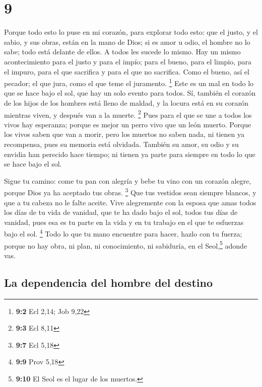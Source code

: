 \hypertarget{section-8}{%
\section{9}\label{section-8}}

 Porque todo esto lo puse en mi corazón, para explorar
todo esto: que el justo, y el sabio, y sus obras, están en la mano de
Dios; si es amor u odio, el hombre no lo sabe; todo está delante de
ellos.  A todos les sucede lo mismo. Hay un mismo
acontecimiento para el justo y para el impío; para el bueno, para el
limpio, para el impuro, para el que sacrifica y para el que no
sacrifica. Como el bueno, así el pecador; el que jura, como el que teme
el juramento. \footnote{\textbf{9:2} Ecl 2,14; Job 9,22} 
Este es un mal en todo lo que se hace bajo el sol, que hay un solo
evento para todos. Sí, también el corazón de los hijos de los hombres
está lleno de maldad, y la locura está en su corazón mientras viven, y
después van a la muerte. \footnote{\textbf{9:3} Ecl 8,11} 
Pues para el que se une a todos los vivos hay esperanza; porque es mejor
un perro vivo que un león muerto.  Porque los vivos saben
que van a morir, pero los muertos no saben nada, ni tienen ya
recompensa, pues su memoria está olvidada.  También su
amor, su odio y su envidia han perecido hace tiempo; ni tienen ya parte
para siempre en todo lo que se hace bajo el sol.

 Sigue tu camino: come tu pan con alegría y bebe tu vino
con un corazón alegre, porque Dios ya ha aceptado tus obras. \footnote{\textbf{9:7}
  Ecl 5,18}  Que tus vestidos sean siempre blancos, y que
a tu cabeza no le falte aceite.  Vive alegremente con la
esposa que amas todos los días de tu vida de vanidad, que te ha dado
bajo el sol, todos tus días de vanidad, pues esa es tu parte en la vida
y en tu trabajo en el que te esfuerzas bajo el sol. \footnote{\textbf{9:9}
  Prov 5,18}  Todo lo que tu mano encuentre para hacer,
hazlo con tu fuerza; porque no hay obra, ni plan, ni conocimiento, ni
sabiduría, en el Seol,\footnote{\textbf{9:10} El Seol es el lugar de los
  muertos.} adonde vas.

\hypertarget{la-dependencia-del-hombre-del-destino}{%
\subsection{La dependencia del hombre del
destino}\label{la-dependencia-del-hombre-del-destino}}

